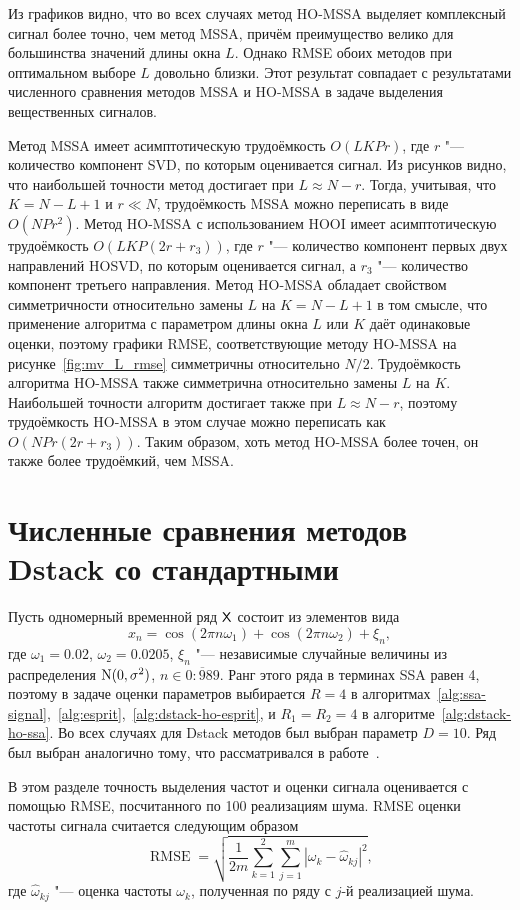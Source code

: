 \documentclass[specialist,
  substylefile=spbu_report.rtx,
subf,href,colorlinks=true, 12pt]{disser}
\theoremstyle{plain}
\theoremstyle{definition}
\theoremstyle{remark}
\begin{document}
Из графиков видно, что во всех случаях метод HO-MSSA выделяет
комплексный сигнал более точно, чем метод MSSA,
причём преимущество велико для большинства значений длины окна $L$.
Однако RMSE обоих методов при оптимальном выборе $L$ довольно близки.
Этот результат совпадает с результатами численного сравнения методов MSSA и
HO-MSSA в задаче выделения вещественных сигналов.

Метод MSSA имеет асимптотическую трудоёмкость $O(LKPr)$, где
$r$ "--- количество компонент SVD, по которым оценивается сигнал.
Из рисунков видно, что наибольшей точности метод достигает при
$L \approx N-r$.
Тогда, учитывая, что $K=N - L + 1$ и $r\ll N$, трудоёмкость MSSA
можно переписать в виде $O(NPr^2)$.
Метод HO-MSSA с использованием HOOI имеет асимптотическую
трудоёмкость $O(LKP(2r+r_3))$, где $r$ "--- количество
компонент первых двух направлений HOSVD,
по которым оценивается сигнал, а $r_3$ "--- количество компонент
третьего направления.
Метод HO-MSSA обладает свойством симметричности относительно
замены $L$ на $K=N-L+1$ в том смысле, что применение алгоритма
с параметром длины окна $L$ или $K$ даёт одинаковые оценки,
поэтому графики RMSE, соответствующие методу HO-MSSA
на рисунке~\ref{fig:mv_L_rmse} симметричны относительно $N/2$.
Трудоёмкость алгоритма HO-MSSA также симметрична относительно
замены $L$ на $K$.
Наибольшей точности алгоритм достигает также при
$L\approx N - r$, поэтому трудоёмкость HO-MSSA в этом случае можно переписать
как $O(NPr(2r+r_3))$.
Таким образом, хоть метод HO-MSSA более точен, он также более
трудоёмкий, чем MSSA.

\section{Численные сравнения методов Dstack со
стандартными}\label{sec:dstack-comparison}
Пусть одномерный временной ряд $\mathsf{X}$ состоит из элементов вида
\[
  x_n = \cos\left(2 \pi n \omega_1\right) + \cos\left(2 \pi n
  \omega_2\right) + \xi_n,
\]
где $\omega_1 = 0.02$, $\omega_2 = 0.0205$, $\xi_n$ "--- независимые
случайные величины из распределения $\mathrm{N}(0, \sigma^2)$, $n \in
\overline{0:989}$.
Ранг этого ряда в терминах SSA равен 4, поэтому в задаче оценки
параметров выбирается $R=4$ в
алгоритмах~\ref{alg:ssa-signal},~\ref{alg:esprit},~\ref{alg:dstack-ho-esprit},
и $R_1=R_2 = 4$ в алгоритме~\ref{alg:dstack-ho-ssa}.
Во всех случаях для Dstack методов был выбран параметр $D=10$.
Ряд был выбран аналогично тому, что рассматривался в работе~\cite{Papy2009}.

В этом разделе точность выделения частот и оценки сигнала
оценивается с помощью RMSE, посчитанного по 100 реализациям шума.
RMSE оценки частоты сигнала считается следующим образом
\begin{equation}
  \label{eq:rmse-estim}
  \operatorname{RMSE} =\sqrt{\frac{1}{2m}
  \sum_{k=1}^{2}\sum_{j=1}^{m} \left|\omega_{k}-\widehat{\omega}_{kj}\right|^2},
\end{equation}
где $\widehat{\omega}_{kj}$ "--- оценка частоты $\omega_k$, полученная по ряду
с $j$-й реализацией шума.
\end{document}

